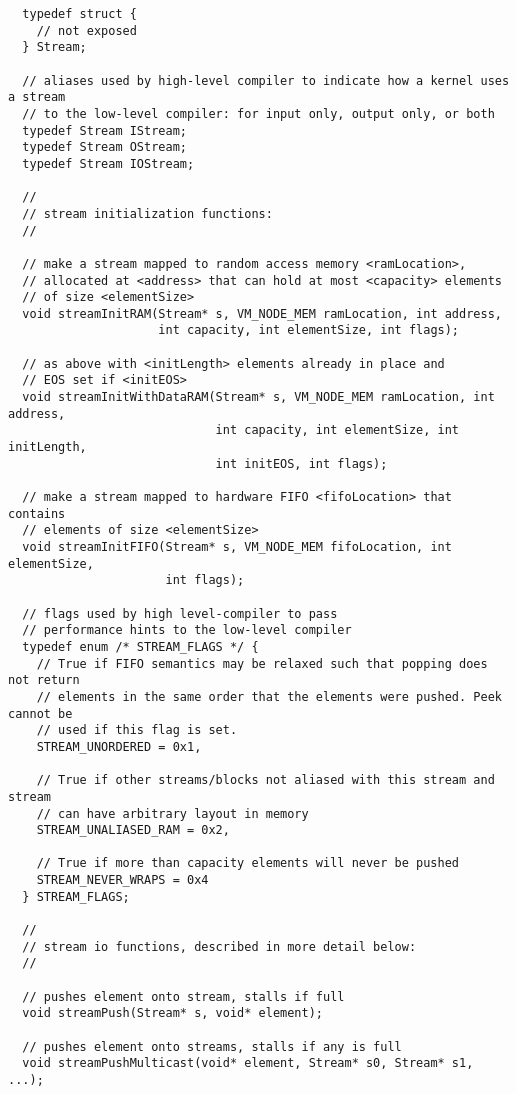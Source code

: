 {\small
\begin{verbatim}
  typedef struct {
    // not exposed
  } Stream;

  // aliases used by high-level compiler to indicate how a kernel uses a stream
  // to the low-level compiler: for input only, output only, or both
  typedef Stream IStream;
  typedef Stream OStream;
  typedef Stream IOStream;

  //
  // stream initialization functions:
  //
  
  // make a stream mapped to random access memory <ramLocation>, 
  // allocated at <address> that can hold at most <capacity> elements
  // of size <elementSize>
  void streamInitRAM(Stream* s, VM_NODE_MEM ramLocation, int address, 
                     int capacity, int elementSize, int flags);

  // as above with <initLength> elements already in place and
  // EOS set if <initEOS>
  void streamInitWithDataRAM(Stream* s, VM_NODE_MEM ramLocation, int address, 
                             int capacity, int elementSize, int initLength, 
                             int initEOS, int flags);

  // make a stream mapped to hardware FIFO <fifoLocation> that contains
  // elements of size <elementSize>
  void streamInitFIFO(Stream* s, VM_NODE_MEM fifoLocation, int elementSize,
                      int flags);

  // flags used by high level-compiler to pass 
  // performance hints to the low-level compiler
  typedef enum /* STREAM_FLAGS */ {
    // True if FIFO semantics may be relaxed such that popping does not return   
    // elements in the same order that the elements were pushed. Peek cannot be
    // used if this flag is set.
    STREAM_UNORDERED = 0x1,

    // True if other streams/blocks not aliased with this stream and stream 
    // can have arbitrary layout in memory
    STREAM_UNALIASED_RAM = 0x2,
    
    // True if more than capacity elements will never be pushed
    STREAM_NEVER_WRAPS = 0x4
  } STREAM_FLAGS;  

  //
  // stream io functions, described in more detail below:
  //
  
  // pushes element onto stream, stalls if full
  void streamPush(Stream* s, void* element);
  
  // pushes element onto streams, stalls if any is full
  void streamPushMulticast(void* element, Stream* s0, Stream* s1, ...);
  

\end{verbatim}}

